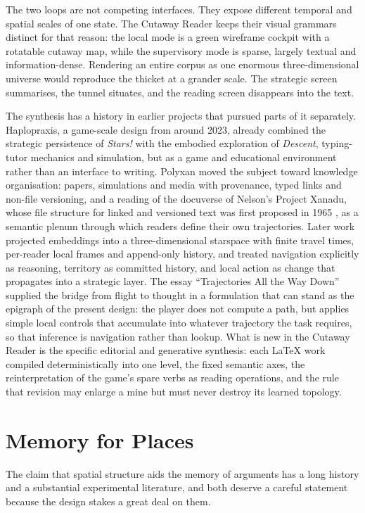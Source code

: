 \documentclass[11pt]{article}
\theoremstyle{remark}
\begin{document}
The two loops are not competing interfaces. They expose different temporal and spatial scales of one state. The Cutaway Reader keeps their visual grammars distinct for that reason: the local mode is a green wireframe cockpit with a rotatable cutaway map, while the supervisory mode is sparse, largely textual and information-dense. Rendering an entire corpus as one enormous three-dimensional universe would reproduce the thicket at a grander scale. The strategic screen summarises, the tunnel situates, and the reading screen disappears into the text.

The synthesis has a history in earlier projects that pursued parts of it separately. Haplopraxis, a game-scale design from around 2023, already combined the strategic persistence of \emph{Stars!} with the embodied exploration of \emph{Descent}, typing-tutor mechanics and simulation, but as a game and educational environment rather than an interface to writing. Polyxan moved the subject toward knowledge organisation: papers, simulations and media with provenance, typed links and non-file versioning, and a reading of the docuverse of Nelson's Project Xanadu, whose file structure for linked and versioned text was first proposed in 1965 \cite{nelson1965}, as a semantic plenum through which readers define their own trajectories. Later work projected embeddings into a three-dimensional starspace with finite travel times, per-reader local frames and append-only history, and treated navigation explicitly as reasoning, territory as committed history, and local action as change that propagates into a strategic layer. The essay ``Trajectories All the Way Down'' supplied the bridge from flight to thought in a formulation that can stand as the epigraph of the present design: the player does not compute a path, but applies simple local controls that accumulate into whatever trajectory the task requires, so that inference is navigation rather than lookup. What is new in the Cutaway Reader is the specific editorial and generative synthesis: each LaTeX work compiled deterministically into one level, the fixed semantic axes, the reinterpretation of the game's spare verbs as reading operations, and the rule that revision may enlarge a mine but must never destroy its learned topology.

\section{Memory for Places}
\label{sec:place-memory}

The claim that spatial structure aids the memory of arguments has a long history and a substantial experimental literature, and both deserve a careful statement because the design stakes a great deal on them.
\end{document}
